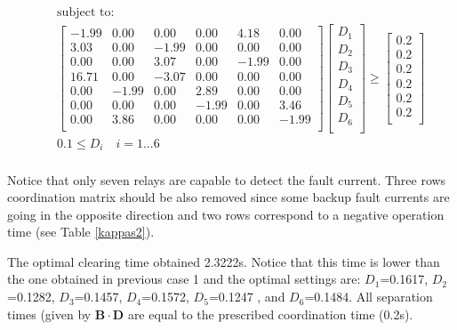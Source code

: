 \documentclass[letterpaper, 10 pt, conference]{IEEEtran}
\begin{document}
\begin{eqnarray}\nonumber
&&\mbox{subject to}:\\\nonumber
&&  \begin{bmatrix}
-1.99	&	0.00	&	0.00	&	0.00	&	4.18	&	0.00	\\	
3.03	&	0.00	&	-1.99	&	0.00	&	0.00	&	0.00	\\	
0.00	&	0.00	&	3.07	&	0.00	&	-1.99	&	0.00	\\	
16.71	&	0.00	&	-3.07	&	0.00	&	0.00	&	0.00	\\	
0.00	&	-1.99	&	0.00	&	2.89	&	0.00	&	0.00	\\	
0.00	&	0.00	&	0.00	&	-1.99	&	0.00	&	3.46	\\	
0.00	&	3.86	&	0.00	&	0.00	&	0.00	&	-1.99	\\	

  \end{bmatrix}
  \begin{bmatrix} \nonumber
  D_1\\D_2\\D_3\\D_4\\D_5\\D_6\\
  \end{bmatrix}
\ge  \begin{bmatrix} \nonumber
  0.2\\0.2\\0.2\\0.2\\0.2\\0.2\\
  \end{bmatrix}\\\nonumber
& & 0.1\le{D_i}\quad i=1...6\\\nonumber
 \end{eqnarray}
\normalsize

Notice that only seven relays are capable to detect the fault current.  Three rows coordination matrix should be also removed since some backup fault currents are going in the opposite direction and two rows correspond to a negative operation time (see Table \ref{kappas2}).

The optimal clearing time obtained 2.3222s. Notice that this time is lower than the one obtained in previous case 1 and the optimal settings are:
$D_1$=0.1617,
$D_2$=0.1282,
$D_3$=0.1457,
$D_4$=0.1572,
$D_5$=0.1247
, and $D_6$=0.1484. All separation times (given by $\mathbf{B}\cdot \mathbf{D}$ are equal to the prescribed coordination time (0.2s).
\end{document}
